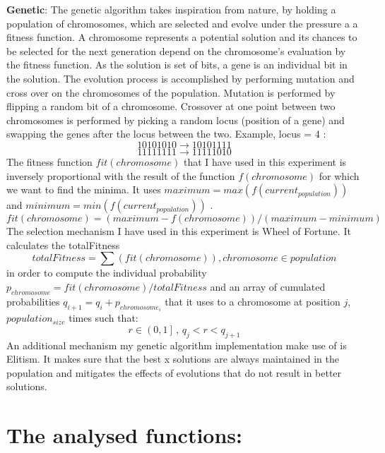 \documentclass{report}
\begin{document}
\noindent
\textbf{Genetic}:
\newline
\newline
The genetic algorithm takes inspiration from nature, by holding a population of chromosomes, which are selected and evolve under the pressure a a fitness function.
A chromosome represents a potential solution and its chances to be selected for the next generation depend on the chromosome's evaluation by the fitness function.
As the solution is set of bits, a gene is an individual bit in the solution. The evolution process is accomplished by performing mutation and cross over on the chromosomes of the population.
\newline
\newline
Mutation is performed by flipping a random bit of a chromosome.
\newline
\newline
Crossover at one point between two chromosomes is performed by picking a random locus (position of a gene) and swapping the genes after the locus between the two. Example, locus = 4 :
$$10101010 \rightarrow 10101111 $$
$$11111111 \rightarrow 11111010 $$
\newline
The fitness function $fit(chromosome)$ that I have used in this experiment is inversely proportional with the result of the function $f(chromosome)$ for which we want to find the minima.
It uses $maximum = max(f(current_{population}))$ and $minimum = min(f(current_{population}))$ .
\newline
$$fit(chromosome) = (maximum - f(chromosome)) / (maximum- minimum)$$
\newline
The selection mechanism I have used in this experiment is Wheel of Fortune. It calculates the totalFitness
$$totalFitness = \sum(fit(chromosome))  , chromosome \in population$$
in order to compute the individual probability $p_{chromosome} = fit(chromosome) /  totalFitness$
and an array of cumulated probabilities $q_{i + 1} = q_{i} + p_{chromosome_i}$ that it uses to a chromosome at position $j$,  $population_{size}$ times such that:
$$r \in \left(0, 1 \right] \, , \, q_j < r < q_{j + 1}$$
\newline
An additional mechanism my genetic algorithm implementation make use of is Elitism. It makes sure that the best x solutions are always maintained in the population and mitigates the effects
of evolutions that do not result in better solutions.

\pagebreak

\section*{The analysed functions:}
\end{document}
